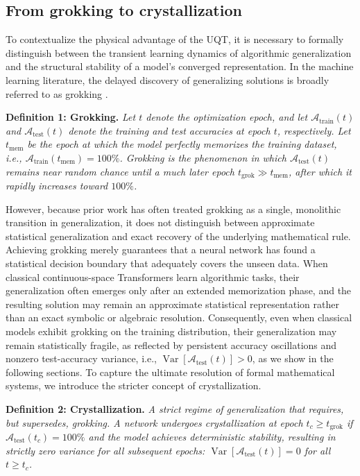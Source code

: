\documentclass[11pt, a4paper]{article}
\begin{document}
\subsection*{From grokking to crystallization}

To contextualize the physical advantage of the UQT, it is necessary to formally distinguish between the transient learning dynamics of algorithmic generalization and the structural stability of a model's converged representation. In the machine learning literature, the delayed discovery of generalizing solutions is broadly referred to as grokking \cite{power2022grokking, liu2022towards}.

\vspace{0.2cm}
\noindent \textbf{Definition 1: Grokking.} \textit{Let $t$ denote the optimization epoch, and let
$\mathcal{A}_{\mathrm{train}}(t)$ and $\mathcal{A}_{\mathrm{test}}(t)$ denote the training and test accuracies at epoch $t$, respectively. Let $t_{\mathrm{mem}}$ be the epoch at which the model perfectly memorizes the training dataset, i.e.,
$\mathcal{A}_{\mathrm{train}}(t_{\mathrm{mem}})=100\%$. Grokking is the phenomenon in which
$\mathcal{A}_{\mathrm{test}}(t)$ remains near random chance until a much later epoch
$t_{\mathrm{grok}} \gg t_{\mathrm{mem}}$, after which it rapidly increases toward $100\%$.}
\vspace{0.2cm}


However, because prior work has often treated grokking as a single, monolithic transition in generalization, it does not distinguish between approximate statistical generalization and exact recovery of the underlying mathematical rule. Achieving grokking merely guarantees that a neural network has found a statistical decision boundary that adequately covers the unseen data. When classical continuous-space Transformers learn algorithmic tasks, their generalization often emerges only after an extended memorization phase, and the resulting solution may remain an approximate statistical representation rather than an exact symbolic or algebraic resolution. Consequently, even when classical models exhibit grokking on the training distribution, their generalization may remain statistically fragile, as reflected by persistent accuracy oscillations and nonzero test-accuracy variance, i.e., $\operatorname{Var}[\mathcal{A}_{\mathrm{test}}(t)] > 0$, as we show in the following sections. To capture the ultimate resolution of formal mathematical systems, we introduce the stricter concept of crystallization.

\vspace{0.2cm}
\noindent \textbf{Definition 2: Crystallization.} \textit{A strict regime of generalization that requires, but supersedes, grokking. A network undergoes crystallization at epoch $t_c \ge t_{\mathrm{grok}}$ if $\mathcal{A}_{\mathrm{test}}(t_c) = 100\%$ and the model achieves deterministic stability, resulting in strictly zero variance for all subsequent epochs: $\operatorname{Var}[\mathcal{A}_{\mathrm{test}}(t)] = 0$ for all $t \ge t_c$.}
\end{document}
